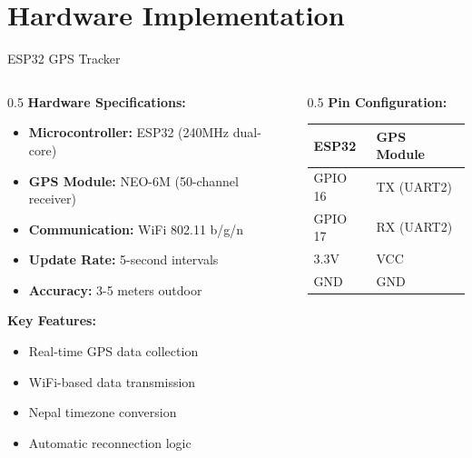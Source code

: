 \documentclass[aspectratio=169]{beamer}
\begin{document}
\section{Hardware Implementation}

\begin{frame}{ESP32 GPS Tracker}
    \begin{columns}
        \begin{column}{0.5\textwidth}
            \textbf{Hardware Specifications:}
            \begin{itemize}
                \item \textbf{Microcontroller:} ESP32 (240MHz dual-core)
                \item \textbf{GPS Module:} NEO-6M (50-channel receiver)
                \item \textbf{Communication:} WiFi 802.11 b/g/n
                \item \textbf{Update Rate:} 5-second intervals
                \item \textbf{Accuracy:} 3-5 meters outdoor
            \end{itemize}
            
            \vspace{0.3cm}
            \textbf{Key Features:}
            \begin{itemize}
                \item Real-time GPS data collection
                \item WiFi-based data transmission
                \item Nepal timezone conversion
                \item Automatic reconnection logic
            \end{itemize}
        \end{column}
        \begin{column}{0.5\textwidth}
            \textbf{Pin Configuration:}
            \begin{center}
                \footnotesize
                \begin{tabular}{|l|l|}
                    \hline
                    \textbf{ESP32} & \textbf{GPS Module} \\
                    \hline
                    GPIO 16 & TX (UART2) \\
                    GPIO 17 & RX (UART2) \\
                    3.3V & VCC \\
                    GND & GND \\
                    \hline
                \end{tabular}
            \end{center}
            

\end{column}
\end{columns}
\end{frame}
\end{document}
